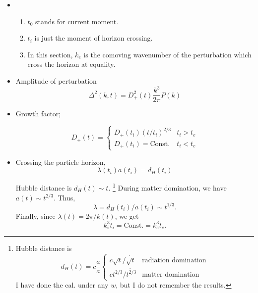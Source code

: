 \documentclass{article}
\begin{document}
\begin{itemize}

\item
\begin{enumerate}
\item
$t_0$ stands for current moment.
\item
$t_i$ is just the moment of horizon crossing.
\item
In this section, $k_e$ is the comoving wavenumber of the perturbation which cross the horizon at equality.

\end{enumerate}


\item
Amplitude of perturbation
\begin{equation}
\Delta^2(k,t)=D_+^2(t)\frac{k^3}{2\pi}P(k)
\end{equation}

\item
Growth factor;

\begin{equation}
D_+(t)=
\begin{cases}
D_+(t_i)(t/t_i)^{2/3} & t_i>t_e \\
D_+(t_i)=\text{Const.} & t_i<t_e
\end{cases}
\end{equation}

\item
Crossing the particle horizon,
\begin{equation}
\lambda(t_i)a(t_i)=d_H(t_i)
\end{equation}

Hubble distance is $d_H(t)\sim t$.
\footnote{
Hubble distance is
\begin{equation}
d_H(t)=c\frac{a}{\dot a}
\begin{cases}
c\sqrt{t}/\dot{\sqrt{t}}  & \text{radiation domination} \\
c t^{2/3}/\dot{t^{2/3}} & \text{matter domination}
\end{cases}
\end{equation}
I have done the cal. under any $w$, but I do not remember the results.
} 
During matter domination, we have $a(t)\sim t^{2/3}$.  Thus, \begin{equation}\lambda=d_H(t_i)/a(t_i)\sim t^{1/3}.\end{equation}
Finally, since $\lambda(t)=2\pi /k(t)$, we get
\begin{equation}
k_i^3t_i=\text{Const.}=k_e^3t_e .
\end{equation}


\end{itemize}
\end{document}
